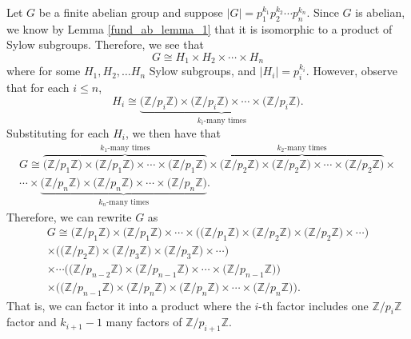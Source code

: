 \documentclass[12pt,letterpaper]{algebra_book}
\newcommand{\ZZ}{\mathbb{Z}}
\theoremstyle{definition}
\begin{document}
    \begin{prf}
        
    Let $G$ be a finite abelian group and suppose $|G| =
    p_1^{k_1}p_2^{k_2} \cdots p_n^{k_n}$. Since $G$ is abelian, 
    we know by Lemma
    \ref{fund_ab_lemma_1} that it is isomorphic to a 
    product of Sylow subgroups. Therefore, we see that 
    \[
        G \cong H_1 \times H_2 \times \cdots \times H_n  
    \] 
    where for some $H_1, H_2, \dots H_n$ Sylow subgroups, and 
    $|H_i| = p_i^{k_i}$. However, observe that for each $i \le n$,  
    \[
        H_i \cong \underbrace{\textbf{(}\mathbb{Z}/p_i\mathbb{Z\textbf{)}} \times \textbf{(}\mathbb{Z}/p_i\mathbb{Z}\textbf{)} \times \cdots \times \textbf{(}\mathbb{Z}/p_i\mathbb{Z}\textbf{)}.}_{k_i\text{-many times}}
    \]
    Substituting for each $H_i$, we then have that 
    \begin{align*}
      G \cong \overbrace{\textbf{(}\mathbb{Z}/p_1\mathbb{Z\textbf{)}} \times \textbf{(}\mathbb{Z}/p_1\mathbb{Z}\textbf{)} \times \cdots \times \textbf{(}\mathbb{Z}/p_1\mathbb{Z}\textbf{)}}^{k_1\text{-many times}} \times 
      \overbrace{\textbf{(}\mathbb{Z}/p_2\mathbb{Z\textbf{)}} \times \textbf{(}\mathbb{Z}/p_2\mathbb{Z}\textbf{)} \times \cdots \times \textbf{(}\mathbb{Z}/p_2\mathbb{Z}\textbf{)}}^{k_2\text{-many times}}
      \times\\ 
      \cdots \times 
      \underbrace{\textbf{(}\mathbb{Z}/p_n\mathbb{Z\textbf{)}} \times \textbf{(}\mathbb{Z}/p_n\mathbb{Z}\textbf{)} \times \cdots \times \textbf{(}\mathbb{Z}/p_n\mathbb{Z}\textbf{)}}_{k_n\text{-many times}}.
    \end{align*}
    Therefore, we can rewrite $G$ as 
    \begin{align*}
       G \cong  \textbf{(}\mathbb{Z}/p_1\mathbb{Z\textbf{)}} \times \textbf{(}\mathbb{Z}/p_1\mathbb{Z}\textbf{)} \times \cdots \times \Big(\textbf{(}\mathbb{Z}/p_1\mathbb{Z}\textbf{)} \times 
      \textbf{(}\mathbb{Z}/p_2\mathbb{Z\textbf{)}} \times \textbf{(}\mathbb{Z}/p_2\mathbb{Z}\textbf{)} \times \cdots \Big)\\
     \times \Big( \textbf{(}\mathbb{Z}/p_2\mathbb{Z}\textbf{)} \times \textbf{(}\mathbb{Z}/p_3\mathbb{Z}\textbf{)}
     \times \textbf{(}\mathbb{Z}/p_3\mathbb{Z}\textbf{)}
     \times \cdots \Big) \\
      \times \cdots \Big(\textbf{(}\ZZ/p_{n-2}\ZZ\textbf{)} \times \textbf{(}\ZZ/p_{n-1}\ZZ\textbf{)} \times \cdots \times \textbf{(}\ZZ/p_{n-1}\ZZ\textbf{)} \Big)\\ 
      \times \Big(\textbf{(}\ZZ/p_{n-1}\ZZ\textbf{)} \times
      \textbf{(}\mathbb{Z}/p_n\mathbb{Z\textbf{)}} \times \textbf{(}\mathbb{Z}/p_n\mathbb{Z}\textbf{)} \times \cdots \times \textbf{(}\mathbb{Z}/p_n\mathbb{Z}\textbf{)} \Big).
    \end{align*}
    That is, we can factor it into a product where the $i$-th factor
    includes one $\ZZ/p_i\ZZ$ factor and $k_{i+1}-1$ many factors of $\ZZ/p_{i+1}\ZZ$.
    

\end{prf}
\end{document}
